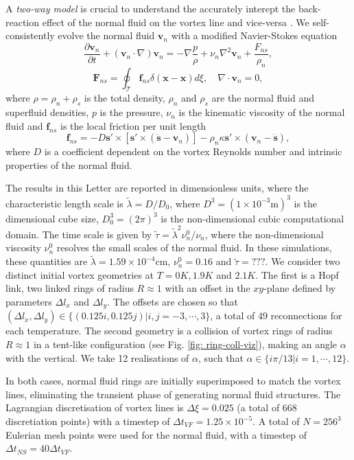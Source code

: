 \documentclass[%
 amsmath,amssymb,
 aps,
prl,
]{revtex4-2}
\def \s{\mathbf{s}}
\def \v{\mathbf{v}}
\def \x{\mathbf{x}}
\begin{document}
A \emph{two-way model} is crucial to understand the accurately interept the back-reaction effect of the normal fluid on the vortex line and vice-versa \cite{stasiakCrossComponentEnergyTransfer2024}. We self-consistently evolve the normal fluid $\v_n$ with a modified Navier-Stokes equation
\begin{equation}
	\frac{\partial \v_n}{\partial t} + (\v_n\cdot\nabla)\v_n = -\nabla\frac{p}{\rho} + \nu_n\nabla^2\v_n + \frac{F_{ns}}{\rho_n},
\end{equation}
\begin{equation}
	\mathbf{F}_{ns} = \oint_{\mathcal{T}}\mathbf{f}_{ns}\delta(\x-\x)d\xi, \quad \nabla\cdot\v_n=0,
\end{equation}
where $\rho=\rho_n + \rho_s$ is the total density, $\rho_n$ and $\rho_s$ are the normal fluid and superfluid densities, $p$ is the pressure, $\nu_n$ is the kinematic viscosity of the normal fluid and $\mathbf{f}_{ns}$ is the local friction per unit length \cite{galantucciCoupledNormalFluid2015a}
\begin{equation}
	\mathbf{f}_{ns} = -D\s'\times\left[\s'\times(\dot{\s}-\v_n)\right]-\rho_n\kappa\s'\times(\v_n-\dot{\s}), 
\end{equation}
where $D$ is a coefficient dependent on the vortex Reynolds number and intrinsic properties of the normal fluid.

The results in this Letter are reported in dimensionless units, where the characteristic length scale is $\tilde{\lambda}=D/D_0$, where $D^3=(1\times10^{-3}\text{m})^3$ is the dimensional cube size, $D_0^3=(2\pi)^3$ is the non-dimensional cubic computational domain. The time scale is given by $\tilde{\tau} = \tilde{\lambda}^2\nu_n^0/\nu_n$, where the non-dimensional viscosity $\nu_n^0$ resolves the small scales of the normal fluid. In these simulations, these quantities are $\tilde{\lambda}=1.59\times10^{-4}\text{cm}$, $\nu_n^0=0.16$ and $\tilde{\tau} = ???$.
We consider two distinct initial vortex geometries at $T=0K,1.9K$ and $2.1K$. The first is a Hopf link, two linked rings of radius $R\approx1$ with an offset in the $xy$-plane defined by parameters $\Delta l_x$ and $\Delta l_y$. The offsets are chosen so that $(\Delta l_x, \Delta l _y) \in \lbrace(0.125i,0.125j)|i,j=-3,\cdots,3 \rbrace$, a total of 49 reconnections for each temperature. The second geometry is a collision of vortex rings of radius $R\approx1$ in a tent-like configuration (see Fig. \ref{fig: ring-coll-viz}), making an angle $\alpha$ with the vertical. We take 12 realisations of $\alpha$, such that $\alpha\in\lbrace i\pi/13|i=1,\cdots,12\rbrace$. 

In both cases, normal fluid rings are initially superimposed to match the vortex lines, eliminating the transient phase of generating normal fluid structures. The Lagrangian discretisation of vortex lines is $\Delta\xi=0.025$ (a total of 668 discretiation points) with a timestep of $\Delta t_{VF}=1.25\times10^{-5}$. A total of $N=256^3$ Eulerian mesh points were used for the normal fluid, with a timestep of $\Delta t_{NS} = 40\Delta t_{VF}$.

\end{document}
